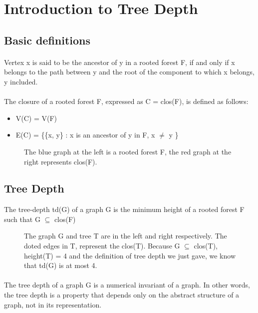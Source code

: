 \section{Introduction to Tree Depth}

\subsection{Basic definitions}

\paragraph{}
Vertex x is said to be the ancestor of y in a rooted forest F, if and only if x belongs to the path between y and the root of the component to which x belongs, y included.
\paragraph{}
The closure of a rooted forest F, expressed as C = clos(F), is defined as follows:
\begin{itemize}
  \item V(C) = V(F)
  \item E(C) = \{\{x, y\} : x is an ancestor of y in F, x $\neq$ y \}
\end{itemize}
\begin{figure}[h]

\caption{The blue graph at the left is a rooted forest F, the red graph at the right represents clos(F).}
\end{figure}

\subsection{Tree Depth}

\begin{definition}
The tree-depth td(G) of a graph G is the minimum height of a rooted forest F such that G $\subseteq$ clos(F)
\end{definition}

\begin{figure}[H]

\caption{The graph G and tree T are in the left and right respectively. The doted edges in T, represent the clos(T). Because G $\subseteq$ clos(T), height(T) = 4 and the definition of tree depth we just gave, we know that td(G) is at most 4.\label{fig:3d-cube}}
\end{figure}
\paragraph{}
The tree depth of a graph G is a numerical invariant of a graph. In other words, the tree depth is a property that depends only  on the abstract structure of a graph, not in its	 representation.	

